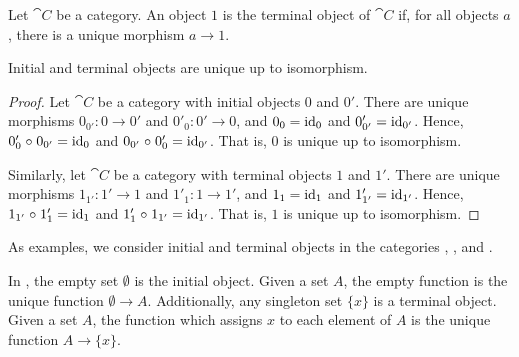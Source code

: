 \begin{definition}
  \label{def:terminal-object}


  Let $\cat{C}$ be a category. An object $1$ is the terminal object of
  $\cat{C}$ if, for all objects $a$, there is a unique morphism $a \to
  1$.

\end{definition}

\begin{lemma}

  Initial and terminal objects are unique up to isomorphism.

  \begin{proof}

    Let $\cat{C}$ be a category with initial objects $0$ and $0'$.
    There are unique morphisms $0_{0'}: 0 \to 0'$ and $0'_{0}: 0' \to
    0$, and $0_{0} = \operatorname{id}_{0}$ and $0'_{0'} = \operatorname{id}_{0'}$. Hence, $0'_{0}
    \mathrel{\circ} 0_{0'} = \operatorname{id}_{0}$ and $0_{0'} \mathrel{\circ} 0'_{0} = \operatorname{id}_{0'}$. That
    is, $0$ is unique up to isomorphism.

    Similarly, let $\cat{C}$ be a category with terminal objects $1$
    and $1'$. There are unique morphisms $1_{1'}: 1' \to 1$ and
    $1'_{1}: 1 \to 1'$, and $1_{1} = \operatorname{id}_{1}$ and $1'_{1'} =
    \operatorname{id}_{1'}$. Hence, $1_{1'} \mathrel{\circ} 1'_{1} = \operatorname{id}_{1}$ and $1'_{1}
    \mathrel{\circ} 1_{1'} = \operatorname{id}_{1'}$. That is, $1$ is unique up to
    isomorphism.

  \end{proof}

\end{lemma}

As examples, we consider initial and terminal objects in the
categories \set, \hask, and \agda.

\begin{example}
  \label{ex:initial-terminal-objects-set}


  In \set, the empty set $\emptyset$ is the initial object. Given a
  set $A$, the empty function is the unique function $\emptyset \to
  A$. Additionally, any singleton set $\{x\}$ is a terminal object.
  Given a set $A$, the function which assigns $x$ to each element of
  $A$ is the unique function $A \to \{x\}$.

\end{example}

